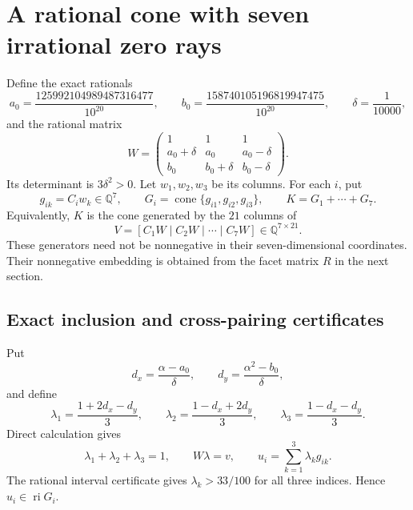 \documentclass[11pt]{article}
\theoremstyle{definition}
\newcommand{\Q}{\mathbb Q}
\newcommand{\cone}{\operatorname{cone}}
\newcommand{\ri}{\operatorname{ri}}
\numberwithin{equation}{section}
\begin{document}
\section{A rational cone with seven irrational zero rays}\label{sec:cone}
Define the exact rationals
\begin{equation}\label{eq:triangleconstants}
 a_0=\frac{125992104989487316477}{10^{20}},\qquad
 b_0=\frac{158740105196819947475}{10^{20}},\qquad
 \delta=\frac1{10000},
\end{equation}
and the rational matrix
\begin{equation}\label{eq:W}
 W=\begin{pmatrix}
 1&1&1\\
 a_0+\delta&a_0&a_0-\delta\\
 b_0&b_0+\delta&b_0-\delta
 \end{pmatrix}.
\end{equation}
Its determinant is $3\delta^2>0$. Let $w_1,w_2,w_3$ be its columns.
For each $i$, put
\begin{equation}\label{eq:GiK}
 g_{ik}=C_iw_k\in\Q^7,\qquad
 G_i=\cone\{g_{i1},g_{i2},g_{i3}\},\qquad
 K=G_1+\cdots+G_7.
\end{equation}
Equivalently, $K$ is the cone generated by the $21$ columns of
\begin{equation}\label{eq:V}
 V=[C_1W\mid C_2W\mid\cdots\mid C_7W]\in\Q^{7\times21}.
\end{equation}
These generators need not be nonnegative in their seven-dimensional
coordinates. Their nonnegative embedding is obtained from the facet matrix
$R$ in the next section.

\subsection{Exact inclusion and cross-pairing certificates}
Put
\[
 d_x=\frac{\alpha-a_0}{\delta},\qquad
 d_y=\frac{\alpha^2-b_0}{\delta},
\]
and define
\begin{equation}\label{eq:barycentric}
 \lambda_1=\frac{1+2d_x-d_y}{3},\qquad
 \lambda_2=\frac{1-d_x+2d_y}{3},\qquad
 \lambda_3=\frac{1-d_x-d_y}{3}.
\end{equation}
Direct calculation gives
\begin{equation}\label{eq:inclusion}
 \lambda_1+\lambda_2+\lambda_3=1,\qquad
 W\lambda=v,\qquad u_i=\sum_{k=1}^3\lambda_kg_{ik}.
\end{equation}
The rational interval certificate gives $\lambda_k>33/100$ for all three
indices. Hence $u_i\in\ri G_i$.
\end{document}
